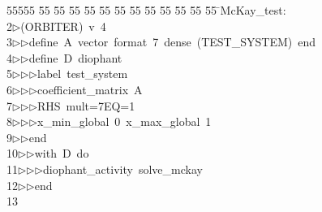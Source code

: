%
%
\begin{tabbing}
55555 \= 55 \= 55 \= 55 \= 55 \= 55 \= 55 \= 55 \= 55 \= 55 \= 55 \= 55 \= 55 \= \>McKay\_test:\\[0pt]
2\>$\triangleright$\>(ORBITER)\ v\ 4\ \\[0pt]
3\>$\triangleright$\>$\triangleright$\>define\ A\ vector\ format\ 7\ dense\ (TEST\_SYSTEM)\ end\ \\[0pt]
4\>$\triangleright$\>$\triangleright$\>define\ D\ diophant\ \\[0pt]
5\>$\triangleright$\>$\triangleright$\>$\triangleright$\>label\ test\_system\ \\[0pt]
6\>$\triangleright$\>$\triangleright$\>$\triangleright$\>coefficient\_matrix\ A\ \\[0pt]
7\>$\triangleright$\>$\triangleright$\>$\triangleright$\>RHS\ mult=7EQ=1\ \\[0pt]
8\>$\triangleright$\>$\triangleright$\>$\triangleright$\>x\_min\_global\ 0\ x\_max\_global\ 1\ \\[0pt]
9\>$\triangleright$\>$\triangleright$\>end\ \\[0pt]
10\>$\triangleright$\>$\triangleright$\>with\ D\ do\ \\[0pt]
11\>$\triangleright$\>$\triangleright$\>$\triangleright$\>diophant\_activity\ solve\_mckay\ \\[0pt]
12\>$\triangleright$\>$\triangleright$\>end\\[0pt]
13\>\end{tabbing}

